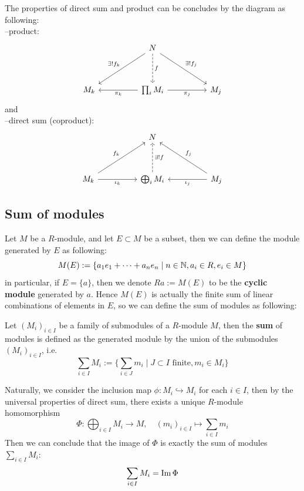\documentclass[12pt,a4paper]{article}
\begin{document}
    The properties of direct sum and product can be concludes by the diagram as following:\\
    --product:
\[\begin{tikzcd}
	&& N \\
	\\
	{M_k} && {\prod_iM_i} && {M_j}
	\arrow["{\exists! f_k}"', from=1-3, to=3-1]
	\arrow["f", dashed, from=1-3, to=3-3]
	\arrow["{\exists! f_j}", from=1-3, to=3-5]
	\arrow["{\pi_k}", from=3-3, to=3-1]
	\arrow["{\pi_j}"', from=3-3, to=3-5]
\end{tikzcd}\]
 and\\
--direct sum (coproduct):
\[\begin{tikzcd}
	&& N \\
	\\
	{M_k} && {\bigoplus_iM_i} && {M_j}
	\arrow["{f_k}", from=3-1, to=1-3]
	\arrow["{\iota_k}"', from=3-1, to=3-3]
	\arrow["{\exists! f}"', dashed, from=3-3, to=1-3]
	\arrow["{f_j}"', from=3-5, to=1-3]
	\arrow["{\iota_j}", from=3-5, to=3-3]
\end{tikzcd}\]

\subsection*{Sum of modules}
Let \(M\) be a \(R\)-module, and let \(E \subset M\) be a subset, then we can define the module generated by \(E\) as following:
\[M(E) := \{a_1e_1+\dots+a_ne_n \mid n\in \mathbb{N}, a_i\in R, e_i \in M\}\]
in particular, if \(E= \{a\}\), then we denote \(Ra := M(E)\) to be the \textbf{cyclic module }generated by \(a\). Hence \(M(E)\) is actually the finite sum of linear combinations of elements in \(E\), so we can define the sum of modules as following:
\begin{definitionplain}
    Let \((M_i)_{i \in I}\) be a family of submodules of a \(R\)-module \(M\), then the \textbf{sum} of modules is defined as the generated module by the union of the submodules \((M_i)_{i \in I}\), i.e.
    \[\sum_{i \in I} M_i := \{\sum_{i \in J} m_{i} \mid J \subset I \text{ finite}, m_{i} \in M_i\}\]
\end{definitionplain}
Naturally, we consider the inclusion map \(\phi: M_i \hookrightarrow M_i\) for each \(i \in I\), then by the universal properties of direct sum, there exists a unique \(R\)-module homomorphism
\[\Phi: \bigoplus_{i \in I}M_i \to M, \quad (m_i)_{i \in I} \mapsto \sum_{i \in I}m_i\]
Then we can conclude that the image of \(\Phi\) is exactly the sum of modules \(\sum_{i \in I} M_i\):
\[\sum_{i \in I}M_i = \operatorname{Im} \Phi\]
\end{document}
